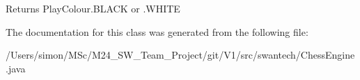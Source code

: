 \begin{DoxyReturn}{Returns}
Play\+Colour.\+B\+L\+A\+C\+K or .W\+H\+I\+T\+E 
\end{DoxyReturn}


The documentation for this class was generated from the following file\+:\begin{DoxyCompactItemize}
\item 
/\+Users/simon/\+M\+Sc/\+M24\+\_\+\+S\+W\+\_\+\+Team\+\_\+\+Project/git/\+V1/src/swantech/Chess\+Engine.\+java\end{DoxyCompactItemize}
